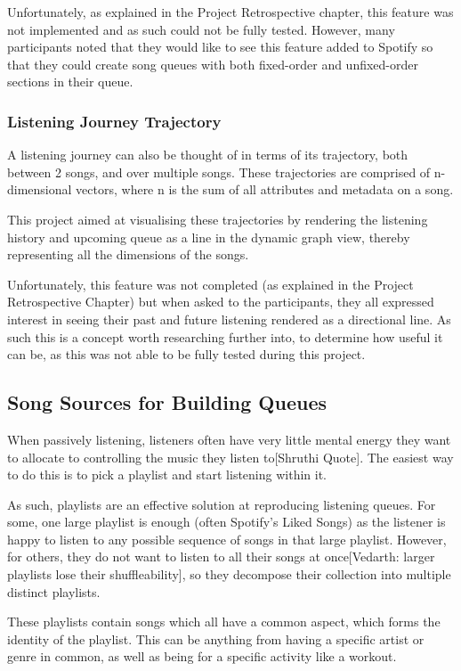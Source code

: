 Unfortunately, as explained in the Project Retrospective chapter, this feature was not implemented and as such could not be fully tested. However, many participants noted that they would like to see this feature added to Spotify so that they could create song queues with both fixed-order and unfixed-order sections in their queue.

\subsubsection{Listening Journey Trajectory}
A listening journey can also be thought of in terms of its trajectory, both between 2 songs, and over multiple songs. These trajectories are comprised of n-dimensional vectors, where n is the sum of all attributes and metadata on a song.

This project aimed at visualising these trajectories by rendering the listening history and upcoming queue as a line in the dynamic graph view, thereby representing all the dimensions of the songs.

Unfortunately, this feature was not completed (as explained in the Project Retrospective Chapter) but when asked to the participants, they all expressed interest in seeing their past and future listening rendered as a directional line. As such this is a concept worth researching further into, to determine how useful it can be, as this was not able to be fully tested during this project.

\subsection{Song Sources for Building Queues}%
When passively listening, listeners often have very little mental energy they want to allocate to controlling the music they listen to[Shruthi Quote]. The easiest way to do this is to pick a playlist and start listening within it.

As such, playlists are an effective solution at reproducing listening queues. For some, one large playlist is enough (often Spotify's Liked Songs) as the listener is happy to listen to any possible sequence of songs in that large playlist. However, for others, they do not want to listen to all their songs at once[Vedarth: larger playlists lose their shuffleability], so they decompose their collection into multiple distinct playlists.

These playlists contain songs which all have a common aspect, which forms the identity of the playlist. This can be anything from having a specific artist or genre in common, as well as being for a specific activity like a workout.

